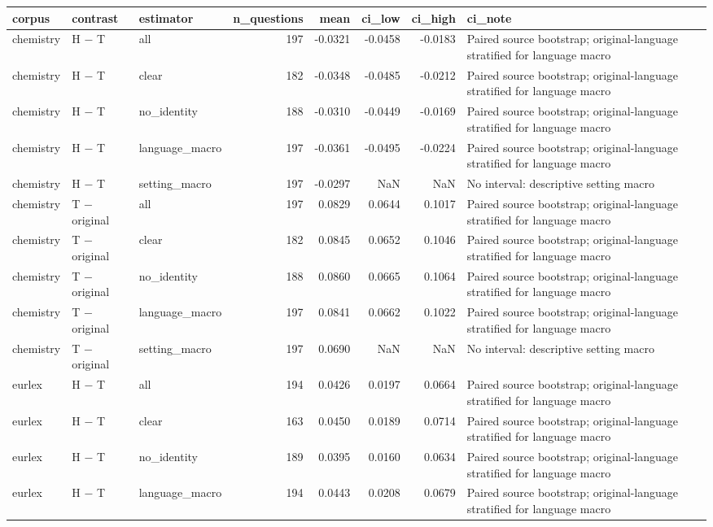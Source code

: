 \begin{tabular}{lllrrrrl}
\toprule
corpus & contrast & estimator & n\_questions & mean & ci\_low & ci\_high & ci\_note \\
\midrule
chemistry & H − T & all & 197 & -0.0321 & -0.0458 & -0.0183 & Paired source bootstrap; original-language stratified for language macro \\
chemistry & H − T & clear & 182 & -0.0348 & -0.0485 & -0.0212 & Paired source bootstrap; original-language stratified for language macro \\
chemistry & H − T & no\_identity & 188 & -0.0310 & -0.0449 & -0.0169 & Paired source bootstrap; original-language stratified for language macro \\
chemistry & H − T & language\_macro & 197 & -0.0361 & -0.0495 & -0.0224 & Paired source bootstrap; original-language stratified for language macro \\
chemistry & H − T & setting\_macro & 197 & -0.0297 & NaN & NaN & No interval: descriptive setting macro \\
chemistry & T − original & all & 197 & 0.0829 & 0.0644 & 0.1017 & Paired source bootstrap; original-language stratified for language macro \\
chemistry & T − original & clear & 182 & 0.0845 & 0.0652 & 0.1046 & Paired source bootstrap; original-language stratified for language macro \\
chemistry & T − original & no\_identity & 188 & 0.0860 & 0.0665 & 0.1064 & Paired source bootstrap; original-language stratified for language macro \\
chemistry & T − original & language\_macro & 197 & 0.0841 & 0.0662 & 0.1022 & Paired source bootstrap; original-language stratified for language macro \\
chemistry & T − original & setting\_macro & 197 & 0.0690 & NaN & NaN & No interval: descriptive setting macro \\
eurlex & H − T & all & 194 & 0.0426 & 0.0197 & 0.0664 & Paired source bootstrap; original-language stratified for language macro \\
eurlex & H − T & clear & 163 & 0.0450 & 0.0189 & 0.0714 & Paired source bootstrap; original-language stratified for language macro \\
eurlex & H − T & no\_identity & 189 & 0.0395 & 0.0160 & 0.0634 & Paired source bootstrap; original-language stratified for language macro \\
eurlex & H − T & language\_macro & 194 & 0.0443 & 0.0208 & 0.0679 & Paired source bootstrap; original-language stratified for language macro \\

\end{tabular}
